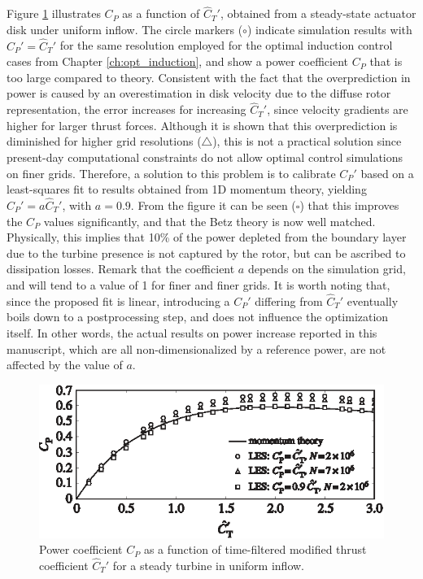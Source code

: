 Figure \ref{fig:fit} illustrates $C_P$ as a function of $\widehat{C}_T'$, obtained from a steady-state actuator disk under uniform inflow. The circle markers ($\circ$) indicate simulation results with $C_P' = \widehat{C}_T'$ for the same resolution employed for the optimal induction control cases from Chapter \ref{ch:opt_induction}, and show a power coefficient $C_P$ that is too large compared to theory. Consistent with the fact that the overprediction in power is caused by an overestimation in disk velocity due to the diffuse rotor representation, the error increases for increasing $\widehat{C}_T'$, since velocity gradients are higher for larger thrust forces. Although it is shown that this overprediction is diminished for higher grid resolutions ($\triangle$), this is not a practical solution since present-day computational constraints do not allow optimal control simulations on finer grids. Therefore, a solution to this problem is to calibrate $C_P'$ based on a least-squares fit to results obtained from 1D momentum theory, yielding $C_P' = a \widehat{C}_T'$, with $a = 0.9$. From the figure it can be seen ($\square$) that this improves the $C_P$ values significantly, and that the Betz theory is now well matched. Physically, this implies that 10\% of the power depleted from the boundary layer due to the turbine presence is not captured by the rotor, but can be ascribed to dissipation losses. Remark that the coefficient $a$ depends on the simulation grid, and will tend to a value of 1 for finer and finer grids. It is worth noting that, since the proposed fit is linear, introducing a $C_P'$ differing from $\widehat{C}_T'$ eventually boils down to a postprocessing step, and does not influence the optimization itself. In other words, the actual results on power increase reported in this manuscript, which are all non-dimensionalized by a reference power, are not affected by the value of $a$.


\begin{figure}[h!]
	\centering
	\includegraphics[width=0.8\linewidth]{chapters/appendix_adm/fig_tuning.eps}
	\caption{Power coefficient $C_P$ as a function of time-filtered modified thrust coefficient $\widehat{C}_T'$ for a steady turbine in uniform inflow.}
	\label{fig:fit}
\end{figure}

\cleardoublepage